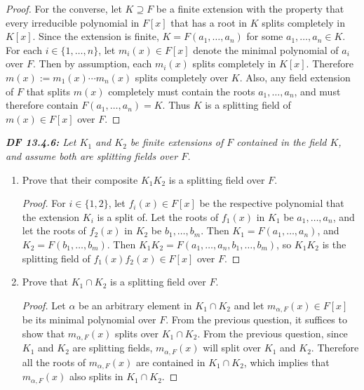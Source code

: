 \documentclass{article}
\begin{document}
\begin{proof}
    For the converse, let $K\supseteq F$ be a finite extension with the
    property that every irreducible polynomial in $F[x]$ that has a root in
    $K$ splits completely in $K[x]$. Since the extension is finite,
    $K=F(a_1,\ldots,a_n)$ for some $a_1,\ldots,a_n\in K$. For each
    $i\in\{1,\ldots,n\}$, let $m_i(x)\in F[x]$ denote the minimal
    polynomial of $a_i$ over $F$. Then by assumption, each $m_i(x)$ splits
    completely in $K[x]$. Therefore $m(x):=m_1(x)\cdots
    m_n(x)$ splits completely over $K$. Also, any field extension of $F$
    that splits $m(x)$ completely must contain the roots $a_1,\ldots,a_n$,
    and must therefore contain $F(a_1,\ldots,a_n)=K$. Thus $K$ is a
    splitting field of $m(x)\in F[x]$ over $F$.
  \end{proof}

\it \textbf{DF 13.4.6:} Let $K_1$ and $K_2$ be finite extensions of $F$
  contained in the field $K$, and assume both are splitting fields over
  $F$.

  \begin{enumerate}[label={(\alph*)}]
    \item Prove that their composite $K_1K_2$ is a splitting field over
      $F$. 

      \begin{proof}
        For $i\in\{1,2\}$, let $f_i(x)\in F[x]$ be the respective
        polynomial that the extension $K_i$ is a split of. Let the roots of
        $f_1(x)$ in $K_1$ be $a_1,\ldots,a_n$, and let the roots of
        $f_2(x)$ in $K_2$ be $b_1,\ldots,b_m$. Then
        $K_1=F(a_1,\ldots,a_n)$, and $K_2=F(b_1,\ldots,b_m)$. Then
        $K_1K_2=F(a_1,\ldots,a_n,b_1,\ldots,b_m)$, so $K_1K_2$ is the
        splitting field of $f_1(x)f_2(x)\in F[x]$ over $F$.
      \end{proof}

    \item Prove that $K_1\cap K_2$ is a splitting field over $F$.

      \begin{proof}
        Let $\alpha$ be an arbitrary element in $K_1\cap K_2$ and let
        $m_{\alpha,F}(x)\in F[x]$ be its minimal polynomial over $F$. From
        the previous question, it suffices to show that $m_{\alpha,F}(x)$
        splits over $K_1\cap K_2$. From the previous question, since $K_1$
        and $K_2$ are splitting fields, $m_{\alpha,F}(x)$ will split over
        $K_1$ and $K_2$. Therefore all the roots of $m_{\alpha,F}(x)$ are
        contained in $K_1\cap K_2$, which implies that $m_{\alpha,F}(x)$
        also splits in $K_1\cap K_2$.
      \end{proof}
  \end{enumerate}
\end{document}
